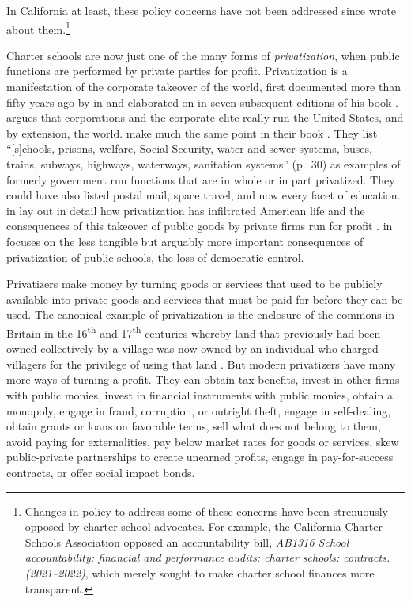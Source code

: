 In California at least, these policy concerns have not been addressed since \citeauthor{Baker.Miron2015} wrote about them.\footnote{Changes in policy to address some of these concerns have been strenuously opposed by charter school advocates. For example, the California Charter Schools Association opposed an accountability bill, \textit{AB1316 School accountability: financial and performance audits: charter schools: contracts. (2021–2022)}, which merely sought to make charter school finances more transparent.}

Charter schools are now just one of the many forms of \textit{privatization}, when public functions are performed by private parties for profit. Privatization is a manifestation of the corporate takeover of the world, first documented more than fifty years ago by \citeauthor{Domhoff2014} in and elaborated on in seven subsequent editions of his book . \citeauthor{Domhoff2014} argues that corporations and the corporate elite really run the United States, and by extension, the world. \textcite{Kahn.Minnich2005} make much the same point in their book  \parencite{Kahn.Minnich2005}. They list ``[s]chools, prisons, welfare, Social Security, water and sewer systems, buses, trains, subways, highways, waterways, sanitation systems'' (p.~30) as examples of formerly government run functions that are in whole or in part privatized. They could have also listed postal mail, space travel, and now every facet of education. \citeauthor{Cohen.Mikaelian2021} in  lay out in detail how privatization has infiltrated American life and the consequences of this takeover of public goods by private firms run for profit  \parencite{Cohen.Mikaelian2021}. \citeauthor{Black2020} in  \parencite{Black2020} focuses on the less tangible but arguably more important consequences of privatization of public schools, the loss of democratic control.

Privatizers make money by turning goods or services that used to be publicly available into private goods and services that must be paid for before they can be used. The canonical example of privatization is the enclosure of the commons in Britain in the 16\textsuperscript{th} and 17\textsuperscript{th} centuries whereby land that previously had been owned collectively by a village was now owned by an individual who charged villagers for the privilege of using that land \parencite{SimonFairlie2009}. But modern privatizers have many more ways of turning a profit. They can obtain tax benefits, invest in other firms with public monies, invest in financial instruments with public monies, obtain a monopoly, engage in fraud, corruption, or outright theft, engage in self-dealing, obtain grants or loans on favorable terms, sell what does not belong to them, avoid paying for externalities, pay below market rates for goods or services, skew public-private partnerships to create unearned profits, engage in pay-for-success contracts, or offer social impact bonds.


